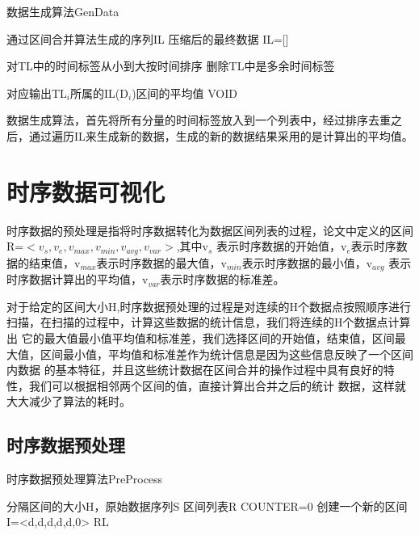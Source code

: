 \begin{algorithm}
\caption{数据生成算法GenData}
\label{alg3}
\begin{algorithmic}[1]
\REQUIRE 通过区间合并算法生成的序列IL
\ENSURE 压缩后的最终数据
\STATE IL=[]
\ENDFOR

\STATE 对TL中的时间标签从小到大按时间排序
\STATE 删除TL中是多余时间标签

	\STATE 对应输出TL$_{i}$所属的IL(D$_{i}$)区间的平均值
\ENDFOR
\RETURN VOID
\end{algorithmic}
\end{algorithm}

数据生成算法，首先将所有分量的时间标签放入到一个列表中，经过排序去重之后，通过遍历IL来生成新的数据，生成的新的数据结果采用的是计算出的平均值。


\section{时序数据可视化}
\label{section 3.2}

时序数据的预处理是指将时序数据转化为数据区间列表的过程，论文中定义的区间R=$<v_{s},v_{e},v_{max},v_{min},v_{avg},v_{var}>$,其中v$_{s}$
表示时序数据的开始值，v$_{e}$表示时序数据的结束值，v$_{max}$表示时序数据的最大值，v$_{min}$表示时序数据的最小值，v$_{avg}$
表示时序数据计算出的平均值，v$_{var}$表示时序数据的标准差。


对于给定的区间大小H,时序数据预处理的过程是对连续的H个数据点按照顺序进行扫描，在扫描的过程中，计算这些数据的统计信息，我们将连续的H个数据点计算出
它的最大值最小值平均值和标准差，我们选择区间的开始值，结束值，区间最大值，区间最小值，平均值和标准差作为统计信息是因为这些信息反映了一个区间内数据
的基本特征，并且这些统计数据在区间合并的操作过程中具有良好的特性，我们可以根据相邻两个区间的值，直接计算出合并之后的统计 
数据，这样就大大减少了算法的耗时。

\subsection{时序数据预处理}
\label{section 3.21}


\begin{algorithm}
\caption{时序数据预处理算法PreProcess}
\label{alg4}
\begin{algorithmic}[1]
\REQUIRE 分隔区间的大小H，原始数据序列S
\ENSURE 区间列表R
\STATE COUNTER=0
\STATE 创建一个新的区间 I=<d,d,d,d,d,0>
\STATE 
\ENDIF
\ENDFOR
\RETURN RL
\end{algorithmic}
\end{algorithm}


